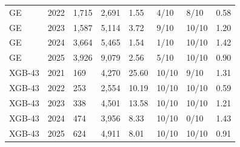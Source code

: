\begin{table}[H]
\begin{tabular}{llllllll}
GE & 2022 & 1,715 & 2,691 & 1.55 & 4/10 & 8/10 & 0.58 \\
GE & 2023 & 1,587 & 5,114 & 3.72 & 9/10 & 10/10 & 1.20 \\
GE & 2024 & 3,664 & 5,465 & 1.54 & 1/10 & 10/10 & 1.42 \\
GE & 2025 & 3,926 & 9,079 & 2.56 & 5/10 & 10/10 & 0.90 \\
XGB-43 & 2021 & 169 & 4,270 & 25.60 & 10/10 & 9/10 & 1.31 \\
XGB-43 & 2022 & 253 & 2,554 & 10.19 & 10/10 & 10/10 & 0.59 \\
XGB-43 & 2023 & 338 & 4,501 & 13.58 & 10/10 & 10/10 & 1.21 \\
XGB-43 & 2024 & 474 & 3,956 & 8.33 & 10/10 & 0/10 & 1.43 \\
XGB-43 & 2025 & 624 & 4,911 & 8.01 & 10/10 & 10/10 & 0.91 \\
\bottomrule
\end{tabular}
\end{table}